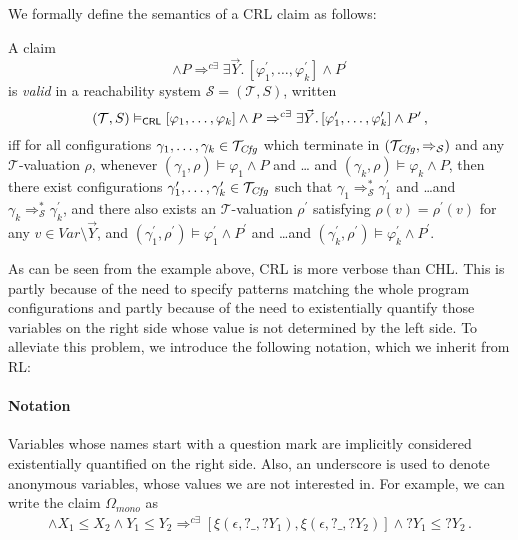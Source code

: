 We formally define the semantics of a CRL claim as follows:
\begin{definition}\label{def:opCRLsemantics}
    A claim
    \begin{equation*}
     [\varphi_1,\ldots,\varphi_k] \land P
     \Rightarrow^{c\exists} \exists \vec{Y}.\, [\varphi^\prime_1,\ldots,\varphi^\prime_k] \land P^\prime
    \end{equation*}
    is \emph{valid} in a reachability system $\mathcal{S} = (\mathcal{T}, S)$,
    written
    \begin{equation*}
        (\mathcal{T}, S) \vDash_{\mathsf{CRL}} [\varphi_1,\ldots,\varphi_k] \land P
     \Rightarrow^{c\exists} \exists \vec{Y}.\, [\varphi^\prime_1,\ldots,\varphi^\prime_k] \land P^\prime \, ,
    \end{equation*}
    iff for all configurations $\gamma_1,\ldots,\gamma_k \in \mathcal{T}_{\mathit{Cfg}}$
    which terminate in $(\mathcal{T}_{\mathit{Cfg}}, \Rightarrow_{\mathcal{S}})$
    and any $\mathcal{T}$-valuation $\rho$,
    whenever $(\gamma_1,\rho) \vDash \varphi_1 \land P$ and \ldots
    and $(\gamma_k,\rho) \vDash \varphi_k \land P$,
    then there exist configurations $\gamma_1^\prime,\ldots,\gamma_k^\prime \in \mathcal{T}_{\mathit{Cfg}}$
    such that $\gamma_1 \Rightarrow^{*}_{\mathcal{S}} \gamma_1^\prime$
    and \ldots and $\gamma_k \Rightarrow^{*}_{\mathcal{S}} \gamma_k^\prime$,
    and there also exists an $\mathcal{T}$-valuation $\rho^\prime$
    satisfying $\rho(v) = \rho^\prime(v)$ for any $v \in \mathit{Var} \setminus \vec{Y}$,
    and
    $(\gamma_1^\prime,\rho^\prime) \vDash \varphi^\prime_1 \land P^\prime$ and \ldots and $(\gamma_k^\prime, \rho^\prime) \vDash \varphi^\prime_k \land P^\prime$.
\end{definition}


As can be seen from the example above, CRL is more verbose than CHL. This is
partly because of the need to specify patterns matching the whole program
configurations and partly because of the need to existentially quantify those
variables on the right side whose value is not determined by the left side. To
alleviate this problem, we introduce the following notation, which we inherit
from RL:

\paragraph{Notation}
Variables whose names start with a question mark are implicitly considered
existentially quantified on the right side.  Also, an underscore is used to
denote anonymous variables, whose values we are not interested in.  For
example, we can write the claim $\Omega_{\textit{mono}}$ as
\begin{align*}
[\xi(P, X_1, Y_1),\xi(P, X_2, Y_2)] \land X_1 \leq X_2 \land Y_1 \leq Y_2
 \Rightarrow^{c\exists} [\xi(\epsilon, ?\_, ?Y_1), \xi(\epsilon, ?\_, ?Y_2)] \land ?Y_1 \leq ?Y_2 \, .
\end{align*}

